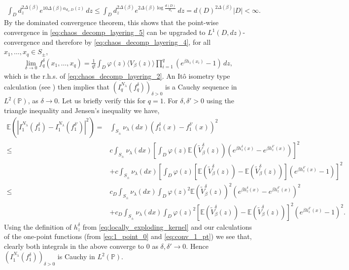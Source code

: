 \documentclass[a4paper, 11pt, reqno]{amsart}
\theoremstyle{definition} \newtheorem{defn}{Definition}[section]
\theoremstyle{remark} \newtheorem{rem}[defn]{Remark}
\theoremstyle{remark} \newtheorem*{rem*}{Remark}
\theoremstyle{plain} \newtheorem{thm}[defn]{Theorem}
\theoremstyle{plain} \newtheorem{lem}[defn]{Lemma}
\theoremstyle{plain} \newtheorem{prop}[defn]{Proposition}
\theoremstyle{plain} \newtheorem{cor}[defn]{Corollary}
\theoremstyle{remark} \newtheorem{exm}[defn]{\textbf{Example}}
\theoremstyle{remark} \newtheorem{exms}[defn]{\textbf{Examples}}
\theoremstyle{remark} \newtheorem*{bl}{}
\numberwithin{equation}{section} %
\newcommand{\pr}{\mathbb{P}}
\newcommand{\E}{\mathbb{E}}
\begin{document}
		\begin{align}\label{eq:chaos_decomp_layering_7}
            \int_D d_z ^{2\Delta(\beta)} e^{10\Delta(\beta) \alpha_{d_z,D}(z)} \, dz
		      \le  \int_D d_z ^{2\Delta(\beta)} e^{2 \Delta(\beta)\log\frac{d(D)}{d_z}} \, dz
		    = d(D)^{2\Delta(\beta)} |D| <\infty.
		\end{align}		
		By the dominated convergence theorem, this shows that the point-wise convergence in \eqref{eq:chaos_decomp_layering_5} can be upgraded to $L^1(D, dz)$-convergence and therefore by \eqref{eq:chaos_decomp_layering_4}, for all $x_1, \ldots, x_q \in S_{\pm}$,
		\begin{align}\label{eq:chaos_decomp_layering_8}
			\lim_{\delta \to 0}f^{\delta}_q(x_1, \ldots, x_q) = \frac{1}{q!} \int_D \varphi(z) \langle V_{\beta}(z) \rangle \prod_{i=1}^q\left(e^{\beta h_z(x_i)} -1\right) \, dz,
		\end{align}
		which is the r.h.s. of \eqref{eq:chaos_decomp_layering_2}. An It\^{o} isometry type calculation (see \cite[Lemma 12.2]{lp18}) then implies that $(I^{N_{\lambda}}_q(f^{\delta}_q))_{\delta>0}$ is a Cauchy sequence in $L^2(\pr)$, as $\delta \to 0$. Let us briefly verify this for $q=1$. For $\delta, \delta'>0$ using the triangle inequality and Jensen's inequality we have,
        \begin{align}
             \E\left( |I^{N_{\lambda}}_1(f^{\delta}_1) - I^{N_{\lambda}}_1(f^{\delta'}_1)|^2 \right) 
            = & \int_{S_{\pm}} \nu_{\lambda}(dx) \left(f^{\delta}_1(x) - f^{\delta'}_1(x)\right)^2
            \nonumber \\
            \le & c \int_{S_{\pm}} \nu_{\lambda}(dx) \left[ \int_D \varphi(z) \E(\tilde{V}^{\delta}_{\beta}(z)) (e^{\beta h^{\delta}_z(x)} - e^{\beta h^{\delta'}_z(x)}) \right]^2 
            \nonumber  \\
            & + c \int_{S_{\pm}} \nu_{\lambda}(dx) \left[ \int_D \varphi(z) [\E(\tilde{V}^{\delta}_{\beta}(z)) - \E(\tilde{V}^{\delta}_{\beta}(z)) ] (e^{\beta h^{\delta'}_z(x)}-1)  \right]^2
            \nonumber \\
            \le & c_D \int_{S_{\pm}} \nu_{\lambda}(dx)  \int_D \varphi(z)^2 \E(\tilde{V}^{\delta}_{\beta}(z))^2 (e^{\beta h^{\delta}_z(x)} - e^{\beta h^{\delta'}_z(x)})^2 
           \nonumber  \\
            & + c_D\int_{S_{\pm}} \nu_{\lambda}(dx)  \int_D \varphi(z)^2 [\E(\tilde{V}^{\delta}_{\beta}(z)) - \E(\tilde{V}^{\delta}_{\beta}(z)) ]^2 (e^{\beta h^{\delta'}_z(x)}-1)^2. 
        \end{align}
        Using the definition of $h^{\delta}_z$ from \eqref{eq:locally_exploding_kernel} and our calculations of the one-point functions (from \eqref{eq:1_point_0} and \eqref{eq:conv_1_pt}) we see that, clearly both integrals in the above converge to $0$ as $\delta, \delta' \to 0$. Hence $(I^{N_{\lambda}}_1(f^{\delta}_1))_{\delta >0}$ is Cauchy in $L^2(\pr)$.
\end{document}

